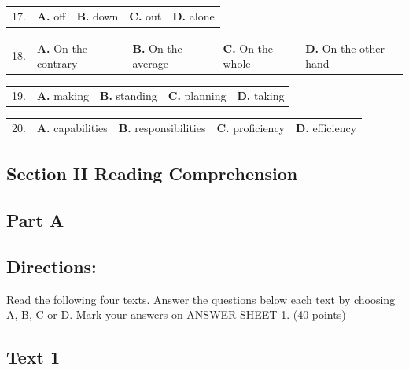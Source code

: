 \documentclass[UTF8,11pt]{ctexart}
\begin{document}
\noindent\begin{tabularx}{\linewidth}{@{}lXXXX@{}}17. & \textbf{A.} off & \textbf{B.} down & \textbf{C.} out & \textbf{D.} alone\\\end{tabularx}\par

\noindent\begin{tabularx}{\linewidth}{@{}lXXXX@{}}18. & \textbf{A.} On the contrary & \textbf{B.} On the average & \textbf{C.} On the whole & \textbf{D.} On the other hand\\\end{tabularx}\par

\noindent\begin{tabularx}{\linewidth}{@{}lXXXX@{}}19. & \textbf{A.} making & \textbf{B.} standing & \textbf{C.} planning & \textbf{D.} taking\\\end{tabularx}\par

\noindent\begin{tabularx}{\linewidth}{@{}lXXXX@{}}20. & \textbf{A.} capabilities & \textbf{B.} responsibilities & \textbf{C.} proficiency & \textbf{D.} efficiency\\\end{tabularx}\par

\subsection*{\textbf{Section II Reading Comprehension}}


\subsection*{\textbf{Part A}}


\subsection*{\textbf{Directions:}}


Read the following four texts. Answer the questions below each text by choosing A, B, C or D. Mark your answers on ANSWER SHEET 1. (40 points)


\subsection*{\textbf{Text 1}}
\end{document}
